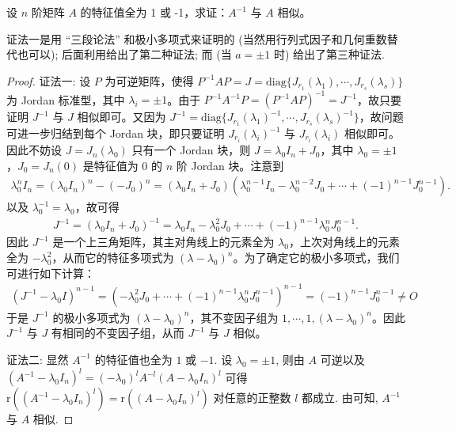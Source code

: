 \documentclass[../../main.tex]{subfiles}%
\begin{document}
\begin{proposition}\label{example:特征值全为正负1的矩阵的逆与其自身相似}
设 \(n\) 阶矩阵 \(A\) 的特征值全为 1 或 -1，求证：\(A^{-1}\) 与 \(A\) 相似。
\end{proposition}
\begin{remark}
{\color{blue}证法一}是用 “三段论法” 和极小多项式来证明的 (当然用行列式因子和几何重数替代也可以); 后面利用给出了第二种证法; 而 (当 $a = \pm 1$ 时) 给出了第三种证法. 
\end{remark}
\begin{proof}

{\color{blue}证法一:}
设 \(P\) 为可逆矩阵，使得 \(P^{-1}AP = J=\mathrm{diag}\{J_{r_1}(\lambda_1),\cdots,J_{r_s}(\lambda_s)\}\) 为 Jordan 标准型，其中 \(\lambda_i = \pm1\)。由于 \(P^{-1}A^{-1}P=(P^{-1}AP)^{-1}=J^{-1}\)，故只要证明 \(J^{-1}\) 与 \(J\) 相似即可。又因为 \(J^{-1}=\mathrm{diag}\{J_{r_1}(\lambda_1)^{-1},\cdots,J_{r_s}(\lambda_s)^{-1}\}\)，故问题可进一步归结到每个 Jordan 块，即只要证明 \(J_{r_i}(\lambda_i)^{-1}\) 与 \(J_{r_i}(\lambda_i)\) 相似即可。因此不妨设 \(J = J_n(\lambda_0)\) 只有一个 Jordan 块，则 \(J = \lambda_0I_n+J_0\)，其中 \(\lambda_0 = \pm1\)，\(J_0 = J_n(0)\) 是特征值为 0 的 \(n\) 阶 Jordan 块。注意到
\begin{align*}
\lambda_0^nI_n=(\lambda_0I_n)^n-(-J_0)^n
=(\lambda_0I_n + J_0)(\lambda_0^{n - 1}I_n-\lambda_0^{n - 2}J_0+\cdots+(-1)^{n - 1}J_0^{n - 1}).
\end{align*}
以及 \(\lambda_0^{-1}=\lambda_0\)，故可得
\begin{align*}
J^{-1}=(\lambda_0I_n + J_0)^{-1}=\lambda_0I_n-\lambda_0^2J_0+\cdots+(-1)^{n - 1}\lambda_0^nJ_0^{n - 1}.
\end{align*}
因此 \(J^{-1}\) 是一个上三角矩阵，其主对角线上的元素全为 \(\lambda_0\)，上次对角线上的元素全为 \(-\lambda_0^2\)，从而它的特征多项式为 \((\lambda - \lambda_0)^n\)。为了确定它的极小多项式，我们可进行如下计算：
\begin{align*}
(J^{-1}-\lambda_0I)^{n - 1}=(-\lambda_0^2J_0+\cdots+(-1)^{n - 1}\lambda_0^nJ_0^{n - 1})^{n - 1}=(-1)^{n - 1}J_0^{n - 1}\neq O
\end{align*}
于是 \(J^{-1}\) 的极小多项式为 \((\lambda - \lambda_0)^n\)，其不变因子组为 \(1,\cdots,1,(\lambda - \lambda_0)^n\)。因此 \(J^{-1}\) 与 \(J\) 有相同的不变因子组，从而 \(J^{-1}\) 与 \(J\) 相似。

{\color{blue}证法二:}
显然 $A^{-1}$ 的特征值也全为 $1$ 或 $-1$. 设 $\lambda_0 = \pm 1$, 则由 $A$ 可逆以及 $(A^{-1} - \lambda_0 I_n)^l = (-\lambda_0)^lA^{-l}(A - \lambda_0 I_n)^l$ 可得 $\mathrm{r}((A^{-1} - \lambda_0 I_n)^l) = \mathrm{r}((A - \lambda_0 I_n)^l)$ 对任意的正整数 $l$ 都成立. 由可知, $A^{-1}$ 与 $A$ 相似.
\end{proof}
\end{document}
